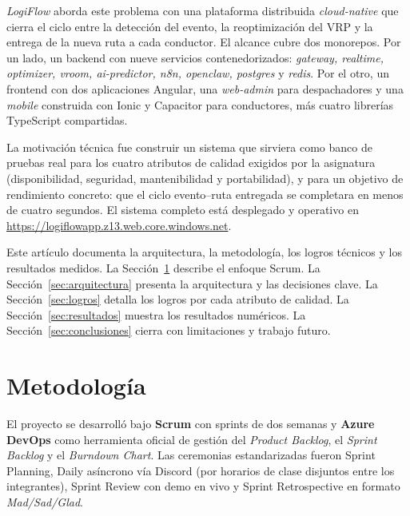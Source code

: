 \documentclass[conference]{IEEEtran}
\begin{document}
\emph{LogiFlow} aborda este problema con una plataforma distribuida \emph{cloud-native} que cierra el ciclo entre la detecci\'on del evento, la reoptimizaci\'on del VRP y la entrega de la nueva ruta a cada conductor. El alcance cubre dos monorepos. Por un lado, un backend con nueve servicios contenedorizados: \emph{gateway, realtime, optimizer, vroom, ai-predictor, n8n, openclaw, postgres} y \emph{redis}. Por el otro, un frontend con dos aplicaciones Angular, una \emph{web-admin} para despachadores y una \emph{mobile} construida con Ionic y Capacitor para conductores, m\'as cuatro librer\'ias TypeScript compartidas.

La motivaci\'on t\'ecnica fue construir un sistema que sirviera como banco de pruebas real para los cuatro atributos de calidad exigidos por la asignatura (disponibilidad, seguridad, mantenibilidad y portabilidad), y para un objetivo de rendimiento concreto: que el ciclo evento--ruta entregada se completara en menos de cuatro segundos. El sistema completo est\'a desplegado y operativo en \url{https://logiflowapp.z13.web.core.windows.net}.

Este art\'iculo documenta la arquitectura, la metodolog\'ia, los logros t\'ecnicos y los resultados medidos. La Secci\'on~\ref{sec:metodologia} describe el enfoque Scrum. La Secci\'on~\ref{sec:arquitectura} presenta la arquitectura y las decisiones clave. La Secci\'on~\ref{sec:logros} detalla los logros por cada atributo de calidad. La Secci\'on~\ref{sec:resultados} muestra los resultados num\'ericos. La Secci\'on~\ref{sec:conclusiones} cierra con limitaciones y trabajo futuro.

\section{Metodolog\'ia}
\label{sec:metodologia}

El proyecto se desarroll\'o bajo \textbf{Scrum} \cite{scrum-guide} con sprints de dos semanas y \textbf{Azure DevOps} como herramienta oficial de gesti\'on del \emph{Product Backlog}, el \emph{Sprint Backlog} y el \emph{Burndown Chart}. Las ceremonias estandarizadas fueron Sprint Planning, Daily as\'incrono v\'ia Discord (por horarios de clase disjuntos entre los integrantes), Sprint Review con demo en vivo y Sprint Retrospective en formato \emph{Mad/Sad/Glad}.
\end{document}
